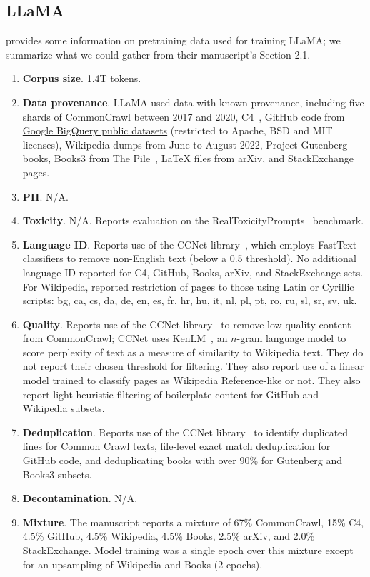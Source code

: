 \subsection{LLaMA~\citep{Touvron2023LLaMAOA}}\label{appendix:llm:llama} 

\citet{Touvron2023LLaMAOA} provides some information on pretraining data used for training LLaMA; we summarize what we could gather from their manuscript's Section 2.1.

\begin{enumerate}
    \item \textbf{Corpus size}. 1.4T tokens. 
    \item \textbf{Data provenance}. LLaMA used data with known provenance, including five shards of CommonCrawl between 2017 and 2020, C4~\citep{raffel2020exploring}, GitHub code from \href{https://cloud.google.com/bigquery/public-data/}{Google BigQuery public datasets} (restricted to Apache, BSD and MIT licenses), Wikipedia dumps from June to August 2022, Project Gutenberg books, Books3 from The Pile~\citep{Gao2020ThePA}, LaTeX files from arXiv, and StackExchange pages. 
    \item \textbf{PII}. N/A.
    \item \textbf{Toxicity}. N/A. Reports evaluation on the RealToxicityPrompts~\citep{gehman-etal-2020-realtoxicityprompts} benchmark.
    \item \textbf{Language ID}. Reports use of the CCNet library~\citep{wenzek-etal-2020-ccnet}, which employs FastText~\citep{joulin2016fasttext} classifiers to remove non-English text (below a 0.5 threshold). No additional language ID reported for C4, GitHub, Books, arXiv, and StackExchange sets. For Wikipedia, reported restriction of pages to those using Latin or Cyrillic scripts: bg, ca, cs, da, de, en, es, fr, hr, hu, it, nl, pl, pt, ro, ru, sl, sr, sv, uk.
    \item \textbf{Quality}. Reports use of the CCNet library~\citep{wenzek-etal-2020-ccnet} to remove low-quality content from CommonCrawl; CCNet uses KenLM~\citep{heafield-2011-kenlm}, an $n$-gram language model to score perplexity of text as a measure of similarity to Wikipedia text. They do not report their chosen threshold for filtering. They also report use of a linear model trained to classify pages as Wikipedia Reference-like or not. They also report light heuristic filtering of boilerplate content for GitHub and Wikipedia subsets.
    \item \textbf{Deduplication}. Reports use of the CCNet library~\citep{wenzek-etal-2020-ccnet} to identify duplicated lines for Common Crawl texts, file-level exact match deduplication for GitHub code, and deduplicating books with over 90\% for Gutenberg and Books3 subsets. 
    \item \textbf{Decontamination}. N/A.
    \item \textbf{Mixture}. The manuscript reports a mixture of 67\% CommonCrawl, 15\% C4, 4.5\% GitHub, 4.5\% Wikipedia, 4.5\% Books, 2.5\% arXiv, and 2.0\% StackExchange. Model training was a single epoch over this mixture except for an upsampling of Wikipedia and Books (2 epochs).
\end{enumerate}


